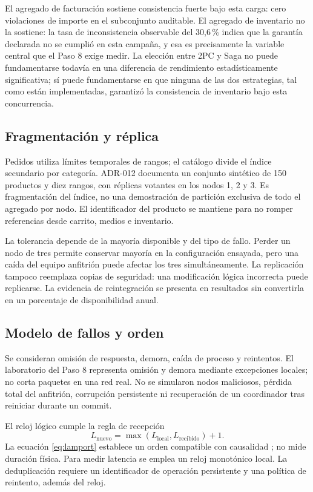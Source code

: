 \documentclass[12pt,a4paper]{article}
\begin{document}
El agregado de facturación sostiene consistencia fuerte bajo esta carga: cero violaciones de importe en el subconjunto auditable. El agregado de inventario no la sostiene: la tasa de inconsistencia observable del 30,6\,\% indica que la garantía declarada no se cumplió en esta campaña, y esa es precisamente la variable central que el Paso 8 exige medir. La elección entre 2PC y Saga no puede fundamentarse todavía en una diferencia de rendimiento estadísticamente significativa; sí puede fundamentarse en que ninguna de las dos estrategias, tal como están implementadas, garantizó la consistencia de inventario bajo esta concurrencia.

\subsection{Fragmentación y réplica}
Pedidos utiliza límites temporales de rangos; el catálogo divide el índice secundario por categoría. ADR-012 documenta un conjunto sintético de 150 productos y diez rangos, con réplicas votantes en los nodos 1, 2 y 3. Es fragmentación del índice, no una demostración de partición exclusiva de todo el agregado por nodo. El identificador del producto se mantiene para no romper referencias desde carrito, medios e inventario.

La tolerancia depende de la mayoría disponible y del tipo de fallo. Perder un nodo de tres permite conservar mayoría en la configuración ensayada, pero una caída del equipo anfitrión puede afectar los tres simultáneamente. La replicación tampoco reemplaza copias de seguridad: una modificación lógica incorrecta puede replicarse. La evidencia de reintegración se presenta en resultados sin convertirla en un porcentaje de disponibilidad anual.

\subsection{Modelo de fallos y orden}
Se consideran omisión de respuesta, demora, caída de proceso y reintentos. El laboratorio del Paso 8 representa omisión y demora mediante excepciones locales; no corta paquetes en una red real. No se simularon nodos maliciosos, pérdida total del anfitrión, corrupción persistente ni recuperación de un coordinador tras reiniciar durante un commit.

El reloj lógico cumple la regla de recepción
\begin{equation}
L_{\mathrm{nuevo}}=\max(L_{\mathrm{local}},L_{\mathrm{recibido}})+1.
\label{eq:lamport}
\end{equation}
La ecuación \ref{eq:lamport} establece un orden compatible con causalidad \cite{lamport1978}; no mide duración física. Para medir latencia se emplea un reloj monotónico local. La deduplicación requiere un identificador de operación persistente y una política de reintento, además del reloj.
\end{document}
